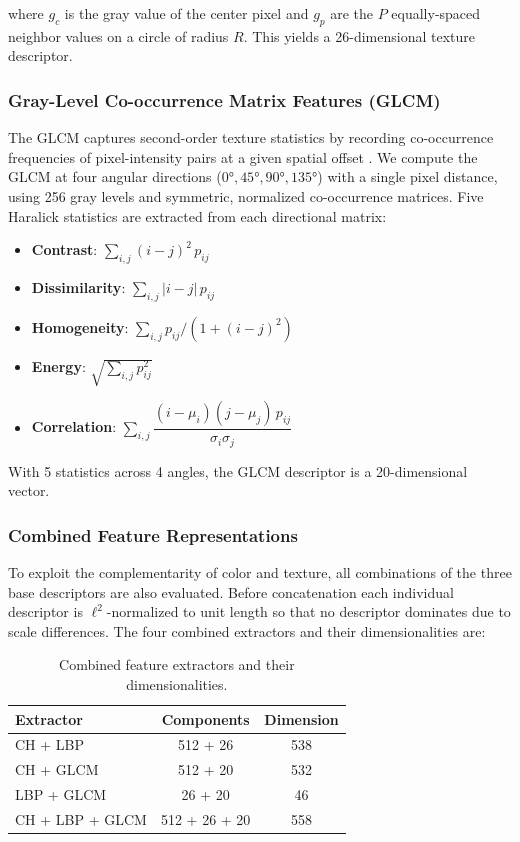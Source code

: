 \documentclass[12pt, a4paper]{article}
\begin{document}
where $g_c$ is the gray value of the center pixel and $g_p$ are the $P$ equally-spaced
neighbor values on a circle of radius $R$. This yields a 26-dimensional texture descriptor.

\subsubsection{Gray-Level Co-occurrence Matrix Features (GLCM)}

The GLCM captures second-order texture statistics by recording co-occurrence frequencies
of pixel-intensity pairs at a given spatial offset \cite{haralick1973}. We compute the GLCM
at four angular directions ($0°, 45°, 90°, 135°$) with a single pixel distance, using
256 gray levels and symmetric, normalized co-occurrence matrices. Five Haralick statistics
are extracted from each directional matrix:

\begin{itemize}[noitemsep]
    \item \textbf{Contrast}: $\sum_{i,j} (i-j)^2\, p_{ij}$
    \item \textbf{Dissimilarity}: $\sum_{i,j} |i-j|\, p_{ij}$
    \item \textbf{Homogeneity}: $\sum_{i,j} p_{ij} / (1 + (i-j)^2)$
    \item \textbf{Energy}: $\sqrt{\sum_{i,j} p_{ij}^2}$
    \item \textbf{Correlation}: $\sum_{i,j} \dfrac{(i-\mu_i)(j-\mu_j)\,p_{ij}}{\sigma_i\sigma_j}$
\end{itemize}

With 5 statistics across 4 angles, the GLCM descriptor is a 20-dimensional vector.

\subsubsection{Combined Feature Representations}

To exploit the complementarity of color and texture, all combinations of the three base
descriptors are also evaluated. Before concatenation each individual descriptor is
$\ell^2$-normalized to unit length so that no descriptor dominates due to scale differences.
The four combined extractors and their dimensionalities are:

\begin{table}[h]
    \centering
    \caption{Combined feature extractors and their dimensionalities.}
    \label{tab:dims}
    \begin{tabular}{@{}lcc@{}}
        \toprule
        \textbf{Extractor} & \textbf{Components} & \textbf{Dimension} \\
        \midrule
        CH + LBP            & 512 + 26          & 538  \\
        CH + GLCM           & 512 + 20          & 532  \\
        LBP + GLCM          & 26 + 20           & 46   \\
        CH + LBP + GLCM     & 512 + 26 + 20     & 558  \\
        \bottomrule
    \end{tabular}
\end{table}
\end{document}
